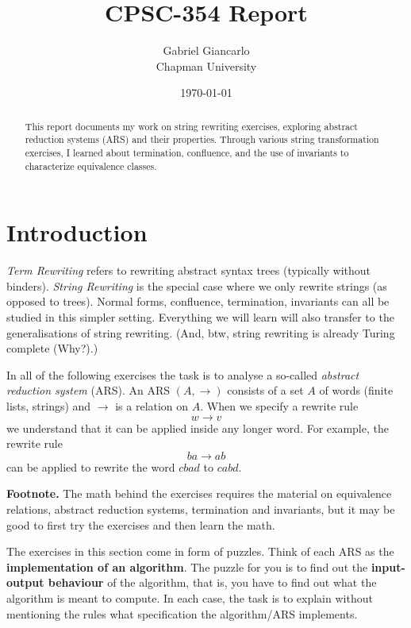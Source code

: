 \documentclass{article}
\title{CPSC-354 Report}
\author{Gabriel Giancarlo \\ Chapman University}
\date{\today}
\theoremstyle{plain}
\theoremstyle{definition}
\theoremstyle{remark}
\begin{document}
\maketitle

\begin{abstract}
This report documents my work on string rewriting exercises, exploring abstract reduction systems (ARS) and their properties. Through various string transformation exercises, I learned about termination, confluence, and the use of invariants to characterize equivalence classes.
\end{abstract}

\setcounter{tocdepth}{3}
\tableofcontents

\section{Introduction}\label{intro}

\textit{Term Rewriting} refers to rewriting abstract syntax trees (typically without binders). 
\textit{String Rewriting} is the special case where we only rewrite strings (as opposed to trees). 
Normal forms, confluence, termination, invariants can all be studied in this simpler setting. 
Everything we will learn will also transfer to the generalisations of string rewriting. 
(And, btw, string rewriting is already Turing complete (Why?).)

\bigskip

In all of the following exercises the task is to analyse a so-called \textit{abstract reduction system} (ARS). 
An ARS $(A,\to)$ consists of a set $A$ of words (finite lists, strings) and $\to$ is a relation on $A$. 
When we specify a rewrite rule
\[
w \to v
\]
we understand that it can be applied inside any longer word. 
For example, the rewrite rule
\[
ba \to ab
\]
can be applied to rewrite the word $cbad$ to $cabd$.

\bigskip

\noindent\textbf{Footnote.} 
The math behind the exercises requires the material on equivalence relations, abstract reduction systems, termination and invariants, but it may be good to first try the exercises and then learn the math.

\bigskip

The exercises in this section come in form of puzzles. 
Think of each ARS as the \textbf{implementation of an algorithm}. 
The puzzle for you is to find out the \textbf{input-output behaviour} of the algorithm, that is, you have to find out what the algorithm is meant to compute. 
In each case, the task is to explain without mentioning the rules what specification the algorithm/ARS implements.
\end{document}
